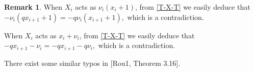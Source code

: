 \documentclass[11pt, reqno]{amsart} \textwidth=14.9cm \oddsidemargin=1cm \evensidemargin=1cm
\theoremstyle{definition}
\newtheorem{remark}[theorem]{Remark}
\numberwithin{equation}{section}
\begin{document}
\begin{remark}
When $X_{i}$ acts as $\nu_{i}(x_{i}+1)$, from \eqref{T-X-T} we easily deduce that $-\nu_{i}(qx_{i+1}+1)=-q\nu_{i}(x_{i+1}+1),$ which is a contradiction.

When $X_{i}$ acts as $x_{i}+\nu_{i}$, from \eqref{T-X-T} we easily deduce that $-qx_{i+1}-\nu_{i}=-qx_{i+1}-q\nu_{i},$ which is a contradiction.

There exist some similar typos in [Rou1, Theorem 3.16].
\end{remark}



\end{document}

